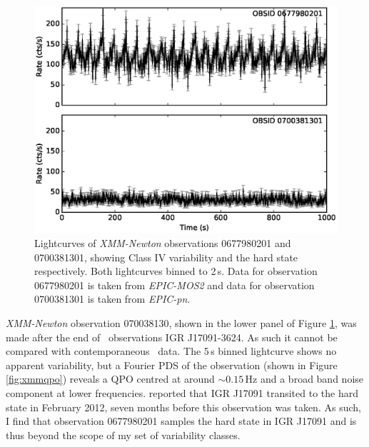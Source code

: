 \begin{figure}
    \includegraphics[width=0.8\columnwidth, trim = 0.6cm 0 3.9cm 0]{images/xmmlc.eps}
    \captionsetup{singlelinecheck=off}
    \caption[\textit{XMM-Newton} lightcurves showing an example of Class IV variability and the hard state.]{Lightcurves of \textit{XMM-Newton} observations 0677980201 and 0700381301, showing Class IV variability and the hard state respectively.  Both lightcurves binned to 2\,s.  Data for observation 0677980201 is taken from \textit{EPIC-MOS2} and data for observation 0700381301 is taken from \textit{EPIC-pn}.}
   \label{fig:XMM}
\end{figure}

\par \textit{XMM-Newton} observation 070038130, shown in the lower panel of Figure \ref{fig:XMM}, was made after the end of \rxte\ observations IGR J17091-3624.  As such it cannot be compared with contemporaneous \rxte\ data.  The 5\,s binned lightcurve shows no apparent variability, but a Fourier PDS of the observation (shown in Figure \ref{fig:xmmqpo}) reveals a QPO centred at around $\sim0.15$\,Hz and a broad band noise component at lower frequencies.  \citet{Drave_Return} reported that IGR J17091 transited to the hard state in February 2012, seven months before this observation was taken.  As such, I find that observation 0677980201 samples the hard state in IGR J17091 and is thus beyond the scope of my set of variability classes.

